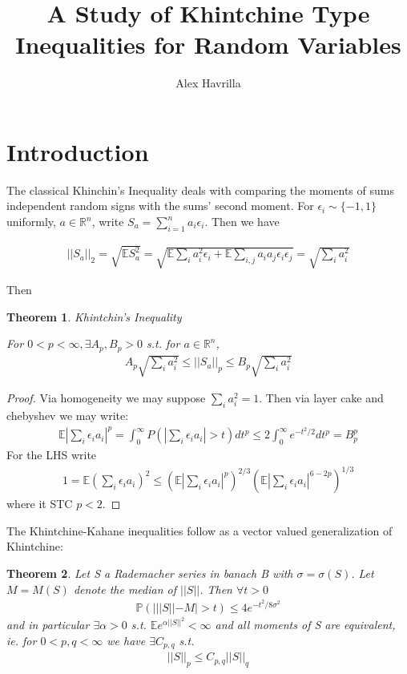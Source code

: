\documentclass[10pt]{article}
\title{\vspace{-3em}A Study of Khintchine Type Inequalities for Random Variables}
\author{Alex Havrilla}
\newcommand{\Pp}{\mathbb{P}}
\newcommand{\E}{\mathbb{E}}
\newcommand{\1}{\textbf{1}}
\newcommand{\R}{\mathbb{R}}
\newcommand{\norm}[1]{||#1||}
\newtheorem{theorem}{Theorem}
\theoremstyle{remark}
\theoremstyle{definition}
\begin{document}
\maketitle

\section{Introduction}

The classical Khinchin's Inequality deals with comparing the moments of sums independent random signs with the sums' second moment. For $\epsilon_i \sim \{-1,1\}$ uniformly, $a \in \R^n$, write $S_a = \sum_{i=1}^n a_i \epsilon_i$. Then we have

\begin{align*}
	\norm{S_a}_2 = \sqrt{\E S_a^2} = \sqrt{\E\sum_i a_i^2 \epsilon_i + \E\sum_{i,j}a_ia_j \epsilon_i\epsilon_j} = \sqrt{\sum_i a_i^2}
\end{align*} 

Then

\begin{theorem}\textit{Khintchin's Inequality}
	
	For $0 < p < \infty, \exists A_p,B_p > 0$ s.t. for $a \in \R^n$,
	\begin{align*}
		A_p\sqrt{\sum_i a_i^2} \leq \norm{S_a}_p \leq B_p \sqrt{\sum_i a_i^2}
	\end{align*}
\end{theorem}


\begin{proof}
	Via homogeneity we may suppose $\sum_i a_i^2 = 1$. Then via layer cake and chebyshev we may write:
	\begin{align*}
		\E |\sum_i \epsilon_i a_i|^p = \int_0^{\infty} P(|\sum_i \epsilon_i a_i | > t) dt^p \leq 2 \int_0^{\infty} e^{-t^2/2}dt^p = B_p^p
	\end{align*}
	For the LHS write
	\begin{align*}
		1 = \E(\sum_i \epsilon_i a_i)^2 \leq (\E |\sum_i \epsilon_i a_i|^p)^{2/3}(\E |\sum_i \epsilon_i a_i|^{6-2p})^{1/3} 
	\end{align*}
	where it STC $p < 2$.
\end{proof}


The Khintchine-Kahane inequalities follow as a vector valued generalization of Khintchine:

\begin{theorem}
	Let S a Rademacher series in banach B with $\sigma = \sigma(S)$. Let $M = M(S)$ denote the median of $\norm{S}$. Then $\forall t > 0$
	\begin{align*}
		\Pp (|\norm{S}- M| > t) \leq 4 e^{-t^2/8\sigma^2}
	\end{align*}
	and in particular $\exists \alpha > 0$ s.t. $\E e^{\alpha \norm{S}^2} < \infty$ and all moments of S are equivalent, ie. for $0 < p , q < \infty$ we have $\exists C_{p,q}$ s.t.
	\begin{align*}
		\norm{S}_p \leq C_{p,q} \norm{S}_q
	\end{align*}
\end{theorem}
\end{document}
